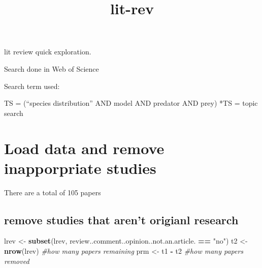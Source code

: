 \documentclass[
]{article}
\title{lit-rev}
\author{}
\date{\vspace{-2.5em}}
\newenvironment{Shaded}{\begin{snugshade}}{\end{snugshade}}
\newcommand{\CommentTok}[1]{\textcolor[rgb]{0.56,0.35,0.01}{\textit{#1}}}
\newcommand{\DataTypeTok}[1]{\textcolor[rgb]{0.13,0.29,0.53}{#1}}
\newcommand{\KeywordTok}[1]{\textcolor[rgb]{0.13,0.29,0.53}{\textbf{#1}}}
\newcommand{\NormalTok}[1]{#1}
\newcommand{\OperatorTok}[1]{\textcolor[rgb]{0.81,0.36,0.00}{\textbf{#1}}}
\newcommand{\OtherTok}[1]{\textcolor[rgb]{0.56,0.35,0.01}{#1}}
\newcommand{\StringTok}[1]{\textcolor[rgb]{0.31,0.60,0.02}{#1}}
\begin{document}
\maketitle

lit review quick exploration.

Search done in Web of Science

Search term used:

TS = (``species distribution'' AND model AND predator AND prey) *TS =
topic search

\hypertarget{load-data-and-remove-inapporpriate-studies}{%
\section{Load data and remove inapporpriate
studies}\label{load-data-and-remove-inapporpriate-studies}}

\begin{Shaded}
\end{Shaded}

There are a total of 105 papers

\hypertarget{remove-studies-that-arent-origianl-research}{%
\subsection{remove studies that aren't origianl
research}\label{remove-studies-that-arent-origianl-research}}

\begin{Shaded}
\begin{Highlighting}[]
\NormalTok{lrev <-}\StringTok{ }\KeywordTok{subset}\NormalTok{(lrev, review..comment..opinion..not.an.article. }\OperatorTok{==}\StringTok{ "no"}\NormalTok{)}
\NormalTok{t2 <-}\StringTok{ }\KeywordTok{nrow}\NormalTok{(lrev) }\CommentTok{#how many papers remaining}
\NormalTok{prm <-}\StringTok{ }\NormalTok{t1 }\OperatorTok{-}\StringTok{ }\NormalTok{t2 }\CommentTok{#how many papers removed}
\end{Highlighting}
\end{Shaded}
\end{document}
